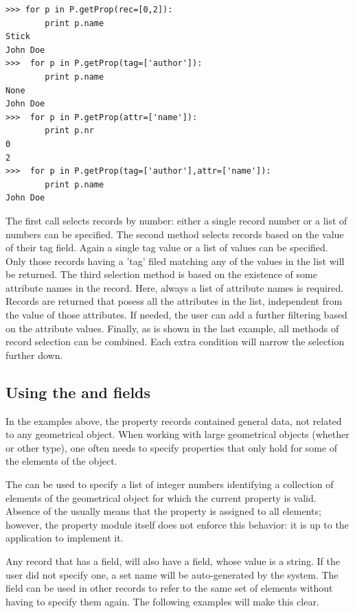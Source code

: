 \begin{verbatim}
>>> for p in P.getProp(rec=[0,2]):
        print p.name
Stick
John Doe
>>>  for p in P.getProp(tag=['author']):
        print p.name
None
John Doe
>>>  for p in P.getProp(attr=['name']):
        print p.nr
0
2
>>>  for p in P.getProp(tag=['author'],attr=['name']):
        print p.name
John Doe
\end{verbatim}
The first call selects records by number: either a single record number or a list of numbers can be specified. The second method selects records based on the value of their tag field. Again a single tag value or a list of values can be specified. Only those records having a 'tag' filed matching any of the values in the list will be returned. The third selection method is based on the existence of some attribute names in the record. Here, always a list of attribute names is required. Records are returned that posess all the attributes in the list, independent from the value of those attributes. If needed, the user can add a further filtering based on the attribute values. Finally, as is shown in the last example, all methods of record selection can be combined. Each extra condition will narrow the selection further down.

\subsection{Using the   and   fields}
\label{sec:set-and-setname}

In the examples above, the property records contained general data, not related to any geometrical object. When working with large geometrical objects (whether  or other type), one often needs to specify properties that only hold for some of the elements of the object. 

The  can be used to specify a list of integer numbers identifying a collection of elements of the geometrical object for which the current property is valid. Absence of the  usually means that the property is assigned to all elements; however, the property module itself does not enforce this behavior: it is up to the application to implement it. 

Any record that has a  field, will also have a  field, whose value is a string. If the user did not specify one, a set name will be auto-generated by the system. The  field can be used in other records to refer to the same set of elements without having to specify them again.
The following examples will make this clear.

